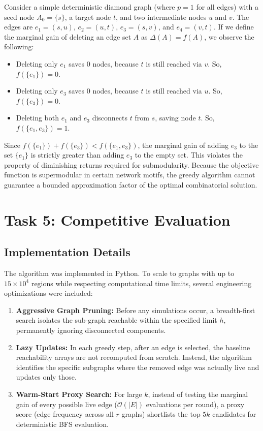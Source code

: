 \documentclass[11pt]{article}
\begin{document}
Consider a simple deterministic diamond graph (where $p=1$ for all edges) with a seed node $A_0 = \{s\}$, a target node $t$, and two intermediate nodes $u$ and $v$. The edges are $e_1 = (s,u)$, $e_2 = (u,t)$, $e_3 = (s,v)$, and $e_4 = (v,t)$. 
If we define the marginal gain of deleting an edge set $A$ as $\Delta(A) = f(A)$, we observe the following:
\begin{itemize}
    \item Deleting only $e_1$ saves $0$ nodes, because $t$ is still reached via $v$. So, $f(\{e_1\}) = 0$.
    \item Deleting only $e_3$ saves $0$ nodes, because $t$ is still reached via $u$. So, $f(\{e_3\}) = 0$.
    \item Deleting both $e_1$ and $e_3$ disconnects $t$ from $s$, saving node $t$. So, $f(\{e_1, e_3\}) = 1$.
\end{itemize}
Since $f(\{e_1\}) + f(\{e_3\}) < f(\{e_1, e_3\})$, the marginal gain of adding $e_3$ to the set $\{e_1\}$ is strictly greater than adding $e_3$ to the empty set. This violates the property of diminishing returns required for submodularity. Because the objective function is supermodular in certain network motifs, the greedy algorithm cannot guarantee a bounded approximation factor of the optimal combinatorial solution.

\newpage
\section*{Task 5: Competitive Evaluation}

\subsection*{Implementation Details}
The algorithm was implemented in Python. To scale to graphs with up to $15 \times 10^4$ regions while respecting computational time limits, several engineering optimizations were included:
\begin{enumerate}
    \item \textbf{Aggressive Graph Pruning:} Before any simulations occur, a breadth-first search isolates the sub-graph reachable within the specified limit $h$, permanently ignoring disconnected components.
    \item \textbf{Lazy Updates:} In each greedy step, after an edge is selected, the baseline reachability arrays are not recomputed from scratch. Instead, the algorithm identifies the specific subgraphs where the removed edge was actually live and updates only those.
    \item \textbf{Warm-Start Proxy Search:} For large $k$, instead of testing the marginal gain of every possible live edge ($\mathcal{O}(|E|)$ evaluations per round), a proxy score (edge frequency across all $r$ graphs) shortlists the top $5k$ candidates for deterministic BFS evaluation. 
\end{enumerate}
\end{document}
